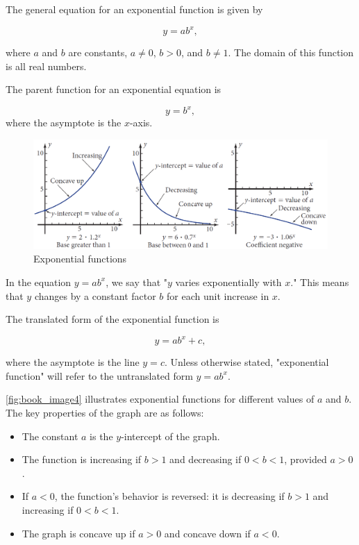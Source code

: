 The general equation for an exponential function is given by

\[
y = a b^x,
\]

where \(a\) and \(b\) are constants, \(a \neq 0\), \(b > 0\), and \(b \neq 1\). The domain of this function is all real numbers.

The parent function for an exponential equation is

\[
y = b^x,
\]
where the asymptote is the \(x\)-axis.

\begin{figure}[htbp]
    \centering
    \includegraphics[width=1\textwidth]{figure/book4.png} %
    \caption{Exponential functions}
    \label{fig:book_image4}
\end{figure}

In the equation \(y = a b^x\), we say that "\(y\) varies exponentially with \(x\)." This means that \(y\) changes by a constant factor \(b\) for each unit increase in \(x\).

The translated form of the exponential function is

\[
y = a b^x + c,
\]

where the asymptote is the line \(y = c\). Unless otherwise stated, "exponential function" will refer to the untranslated form \(y = a b^x\).

\autoref{fig:book_image4} illustrates exponential functions for different values of \(a\) and \(b\). The key properties of the graph are as follows:
\begin{itemize}
    \item The constant \(a\) is the \(y\)-intercept of the graph.
    \item The function is increasing if \(b > 1\) and decreasing if \(0 < b < 1\), provided \(a > 0\).
    \item If \(a < 0\), the function's behavior is reversed: it is decreasing if \(b > 1\) and increasing if \(0 < b < 1\).
    \item The graph is concave up if \(a > 0\) and concave down if \(a < 0\).
\end{itemize}

